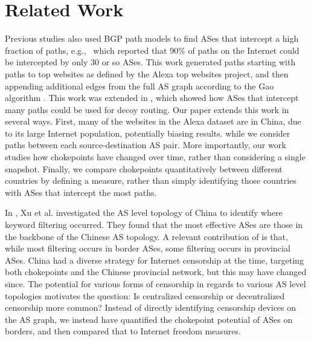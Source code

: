 \section{Related Work}   
\par
Previous studies also used BGP path models to find ASes that
intercept a high fraction of paths, e.g.,~\cite{throats} which
reported that 90\% of paths on the Internet could be intercepted by only 30
or so ASes. This work generated paths starting with
paths to top websites
as defined by the Alexa top websites project,
and then appending additional edges from the full
AS graph according to the Gao algorithm \cite{gao}.
This work was extended
in \cite{decoy}, which showed how ASes that intercept many paths could
be used for decoy routing. Our paper extends this work in several ways.
First, 
many of the websites in the Alexa dataset are in China, due to its large
Internet population, potentially biasing results.
while we consider paths between each
source-destination AS pair.  More importantly, our work studies how chokepoints have changed over time, rather than considering 
a single snapshot.
Finally, we compare chokepoints quantitatively between different
countries by defining a measure, rather than simply identifying those
countries with ASes that intercept the most paths. 

\par
In \cite{chinafiltering}, Xu et al. investigated the AS level topology of China
to identify where keyword filtering occurred. They found that the most
effective ASes
are those in the backbone of the Chinese AS topology. A relevant
contribution of \cite{chinafiltering} is that, while most filtering
occurs in border ASes, some filtering occurs in provincial ASes. China
had a diverse strategy for Internet censorship at the time, targeting
both chokepoints and the Chinese provincial network, but this may have
changed since. The potential for various forms of censorship in
regards to various AS level topologies motivates the question: Is
centralized censorship or decentralized censorship more common?
Instead of directly identifying censorship devices on the AS graph, we
instead have quantified the chokepoint potential of ASes on borders,
and then compared that to  Internet freedom measures.

